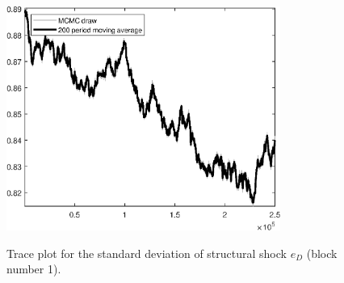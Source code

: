 \begin{figure}[H]
\centering
  \includegraphics[width=0.8\textwidth]{BRS_est_shopping/graphs/TracePlot_SE_e_D_blck_1}\\
    \caption{Trace plot for the standard deviation of structural shock ${e_D}$ (block number 1).}
\end{figure}
